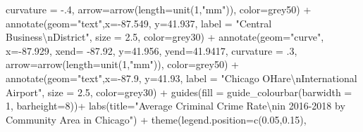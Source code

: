 \documentclass[
]{report}
\newenvironment{Shaded}{}{}
\newcommand{\AttributeTok}[1]{\textcolor[rgb]{0.84,0.23,0.29}{#1}}
\newcommand{\DecValTok}[1]{\textcolor[rgb]{0.00,0.36,0.77}{#1}}
\newcommand{\FloatTok}[1]{\textcolor[rgb]{0.00,0.36,0.77}{#1}}
\newcommand{\FunctionTok}[1]{\textcolor[rgb]{0.44,0.26,0.76}{#1}}
\newcommand{\NormalTok}[1]{\textcolor[rgb]{0.14,0.16,0.18}{#1}}
\newcommand{\SpecialCharTok}[1]{\textcolor[rgb]{0.00,0.36,0.77}{#1}}
\newcommand{\StringTok}[1]{\textcolor[rgb]{0.01,0.18,0.38}{#1}}
\begin{document}
\begin{Shaded}
\begin{Highlighting}[]
           \AttributeTok{curvature =} \SpecialCharTok{{-}}\NormalTok{.}\DecValTok{4}\NormalTok{, }\AttributeTok{arrow=}\FunctionTok{arrow}\NormalTok{(}\AttributeTok{length=}\FunctionTok{unit}\NormalTok{(}\DecValTok{1}\NormalTok{,}\StringTok{"mm"}\NormalTok{)), }\AttributeTok{color=}\StringTok{\textquotesingle{}grey50\textquotesingle{}}\NormalTok{) }\SpecialCharTok{+}
  \FunctionTok{annotate}\NormalTok{(}\AttributeTok{geom=}\StringTok{"text"}\NormalTok{,}\AttributeTok{x=}\SpecialCharTok{{-}}\FloatTok{87.549}\NormalTok{, }\AttributeTok{y=}\FloatTok{41.937}\NormalTok{, }\AttributeTok{label =} \StringTok{"Central Business}\SpecialCharTok{\textbackslash{}n}\StringTok{District"}\NormalTok{,}
           \AttributeTok{size =} \FloatTok{2.5}\NormalTok{, }\AttributeTok{color=}\StringTok{\textquotesingle{}grey30\textquotesingle{}}\NormalTok{) }\SpecialCharTok{+}
  \FunctionTok{annotate}\NormalTok{(}\AttributeTok{geom=}\StringTok{"curve"}\NormalTok{, }\AttributeTok{x=}\SpecialCharTok{{-}}\FloatTok{87.929}\NormalTok{, }\AttributeTok{xend=} \SpecialCharTok{{-}}\FloatTok{87.92}\NormalTok{, }\AttributeTok{y=}\FloatTok{41.956}\NormalTok{, }\AttributeTok{yend=}\FloatTok{41.9417}\NormalTok{,}
           \AttributeTok{curvature =}\NormalTok{ .}\DecValTok{3}\NormalTok{, }\AttributeTok{arrow=}\FunctionTok{arrow}\NormalTok{(}\AttributeTok{length=}\FunctionTok{unit}\NormalTok{(}\DecValTok{1}\NormalTok{,}\StringTok{"mm"}\NormalTok{)), }\AttributeTok{color=}\StringTok{\textquotesingle{}grey50\textquotesingle{}}\NormalTok{) }\SpecialCharTok{+}
  \FunctionTok{annotate}\NormalTok{(}\AttributeTok{geom=}\StringTok{"text"}\NormalTok{,}\AttributeTok{x=}\SpecialCharTok{{-}}\FloatTok{87.9}\NormalTok{, }\AttributeTok{y=}\FloatTok{41.93}\NormalTok{, }\AttributeTok{label =} \StringTok{"Chicago O\textquotesingle{}Hare}\SpecialCharTok{\textbackslash{}n}\StringTok{International Airport"}\NormalTok{,}
           \AttributeTok{size =} \FloatTok{2.5}\NormalTok{, }\AttributeTok{color=}\StringTok{\textquotesingle{}grey30\textquotesingle{}}\NormalTok{) }\SpecialCharTok{+}
  \FunctionTok{guides}\NormalTok{(}\AttributeTok{fill =} \FunctionTok{guide\_colourbar}\NormalTok{(}\AttributeTok{barwidth =} \DecValTok{1}\NormalTok{, }\AttributeTok{barheight=}\DecValTok{8}\NormalTok{))}\SpecialCharTok{+}
  \FunctionTok{labs}\NormalTok{(}\AttributeTok{title=}\StringTok{"Average Criminal Crime Rate}\SpecialCharTok{\textbackslash{}n}\StringTok{in 2016{-}2018 by Community Area in Chicago"}\NormalTok{) }\SpecialCharTok{+}
  \FunctionTok{theme}\NormalTok{(}\AttributeTok{legend.position=}\FunctionTok{c}\NormalTok{(}\FloatTok{0.05}\NormalTok{,}\FloatTok{0.15}\NormalTok{), }

\end{Highlighting}
\end{Shaded}
\end{document}
